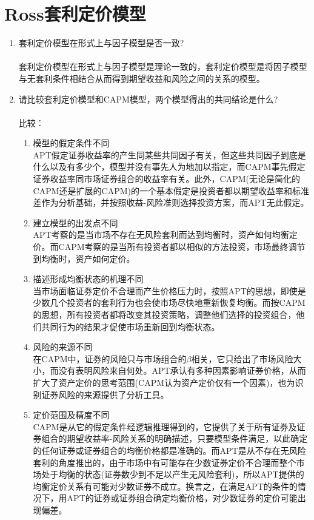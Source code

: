 \section{Ross套利定价模型}
\begin{enumerate}
    \item 套利定价模型在形式上与因子模型是否一致?\\
    \sol\\
    套利定价模型在形式上与因子模型是理论一致的，套利定价模型是将因子模型与无套利条件相结合从而得到期望收益和风险之间的关系的模型。
    \item 请比较套利定价模型和CAPM模型，两个模型得出的共同结论是什么?\\
    \sol\\
    比较：
    \begin{enumerate}[label=(\arabic*)]
        \item 模型的假定条件不同\\
        APT假定证券收益率的产生同某些共同因子有关，但这些共同因子到底是什么以及有多少个，模型并没有事先人为地加以指定，而CAPM事先假定证券收益率同市场证券组合的收益率有关。此外，CAPM(无论是简化的CAPM还是扩展的CAPM)的一个基本假定是投资者都以期望收益率和标准差作为分析基础，并按照收益-风险准则选择投资方案，而APT无此假定。
        \item 建立模型的出发点不同\\
        APT考察的是当市场不存在无风险套利而达到均衡时，资产如何均衡定价。而CAPM考察的是当所有投资者都以相似的方法投资，市场最终调节到均衡时，资产如何定价。
        \item 描述形成均衡状态的机理不同\\
        当市场面临证券定价不合理而产生价格压力时，按照APT的思想，即使是少数几个投资者的套利行为也会使市场尽快地重新恢复均衡。而按CAPM的思想，所有投资者都将改变其投资策略，调整他们选择的投资组合，他们共同行为的结果才促使市场重新回到均衡状态。
        \item 风险的来源不同\\
        在CAPM中，证券的风险只与市场组合的$\beta$相关，它只给出了市场风险大小，而没有表明风险来自何处。APT承认有多种因素影响证券价格，从而扩大了资产定价的思考范围(CAPM认为资产定价仅有一个因素)，也为识别证券风险的来源提供了分析工具。
        \item 定价范围及精度不同\\
        CAPM是从它的假定条件经逻辑推理得到的，它提供了关于所有证券及证券组合的期望收益率-风险关系的明确描述，只要模型条件满足，以此确定的任何证券或证券组合的均衡价格都是准确的。而APT是从不存在无风险套利的角度推出的，由于市场中有可能存在少数证券定价不合理而整个市场处于均衡的状态(证券数少到不足以产生无风险套利)，所以APT提供的均衡定价关系有可能对少数证券不成立。换言之，在满足APT的条件的情况下，用APT的证券或证券组合确定均衡价格，对少数证券的定价可能出现偏差。

\end{enumerate}
\end{enumerate}
